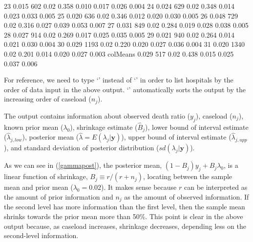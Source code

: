 \documentclass[article]{jss}
\begin{document}
\begin{CodeChunk}
\begin{CodeOutput}
23          0.015  602       0.02     0.358    0.010     0.017    0.026   0.004
24          0.024  629       0.02     0.348    0.014     0.023    0.033   0.005
25          0.020  636       0.02     0.346    0.012     0.020    0.030   0.005
26          0.048  729       0.02     0.316    0.027     0.039    0.053   0.007
27          0.031  849       0.02     0.284    0.019     0.028    0.038   0.005
28          0.027  914       0.02     0.269    0.017     0.025    0.035   0.005
29          0.021  940       0.02     0.264    0.014     0.021    0.030   0.004
30          0.029 1193       0.02     0.220    0.020     0.027    0.036   0.004
31          0.020 1340       0.02     0.201    0.014     0.020    0.027   0.003
colMeans    0.029  517       0.02     0.438    0.015     0.025    0.037   0.006
\end{CodeOutput}
\end{CodeChunk}
For reference, we need to type `' instead of `' in order to list hospitals by the order of data input in the above output. `' automatically sorts the output by the increasing order of caseload ($n_{j}$). 


The output contains information about observed death ratio ($y_{j}$), caseload ($n_{j}$), known prior mean ($\lambda_{0}$), shrinkage estimate ($\hat{B}_{j}$), lower bound of interval estimate ($\hat{\lambda}_{j, low}$), posterior mean ($\hat{\lambda}=E(\lambda_{j}\vert \textbf{y})$), upper bound of interval estimate ($\hat{\lambda}_{j, upp}$), and standard deviation of posterior distribution ($sd(\lambda_{j}\vert \textbf{y})$).


As we can see in (\ref{gammapost}), the posterior mean, $(1-B_{j})y_{j} + B_{j}\lambda_{0}$, is a linear function of shrinkage, $B_{j}\equiv r / (r + n_{j})$, locating between the sample mean and prior mean ($\lambda_{0}=0.02$). It makes sense because $r$ can be interpreted as the amount of prior information and $n_{j}$ as the amount of observed information. If the second level has more information than the first level, then the sample mean shrinks towards the prior mean more than 50\%. This point is clear in the above output because, as caseload increases, shrinkage decreases, depending less on the second-level information.
\end{document}
